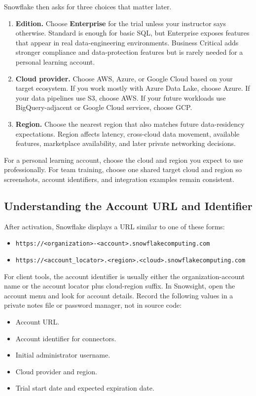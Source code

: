 Snowflake then asks for three choices that matter later.
\begin{enumerate}
    \item \textbf{Edition.} Choose \textbf{Enterprise} for the trial unless your instructor says otherwise. Standard is enough for basic SQL, but Enterprise exposes features that appear in real data-engineering environments. Business Critical adds stronger compliance and data-protection features but is rarely needed for a personal learning account.
    \item \textbf{Cloud provider.} Choose AWS, Azure, or Google Cloud based on your target ecosystem. If you work mostly with Azure Data Lake, choose Azure. If your data pipelines use S3, choose AWS. If your future workloads use BigQuery-adjacent or Google Cloud services, choose GCP.
    \item \textbf{Region.} Choose the nearest region that also matches future data-residency expectations. Region affects latency, cross-cloud data movement, available features, marketplace availability, and later private networking decisions.
\end{enumerate}

\begin{tipbox}
For a personal learning account, choose the cloud and region you expect to use professionally. For team training, choose one shared target cloud and region so screenshots, account identifiers, and integration examples remain consistent.
\end{tipbox}

\subsection{Understanding the Account URL and Identifier}
After activation, Snowflake displays a URL similar to one of these forms:
\begin{itemize}
    \item \texttt{https://<organization>-<account>.snowflakecomputing.com}
    \item \texttt{https://<account\_locator>.<region>.<cloud>.snowflakecomputing.com}
\end{itemize}
For client tools, the account identifier is usually either the organization-account name or the account locator plus cloud-region suffix. In Snowsight, open the account menu and look for account details. Record the following values in a private notes file or password manager, not in source code:
\begin{itemize}
    \item Account URL.
    \item Account identifier for connectors.
    \item Initial administrator username.
    \item Cloud provider and region.
    \item Trial start date and expected expiration date.
\end{itemize}


